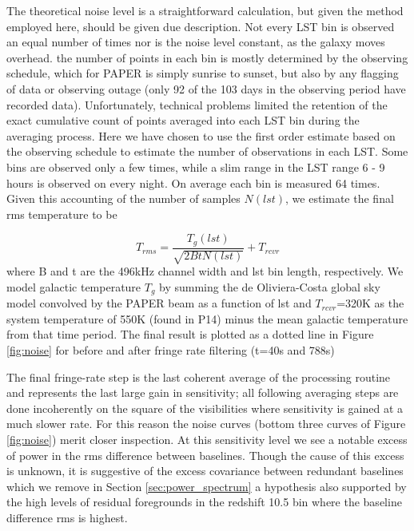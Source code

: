 \documentclass[preprint]{aastex}
\begin{document}
The theoretical noise level is a straightforward calculation, but given the method employed here, should be given due description.
Not every LST bin is observed an equal number of times nor is the noise level constant, as the galaxy moves overhead.  the number of points in each bin is mostly determined by the observing schedule, which for PAPER is simply sunrise to sunset, but also by any flagging of data or observing outage (only 92 of the 103 days in the observing period have recorded data).  Unfortunately, technical problems limited the retention of the exact cumulative count of points averaged into each LST bin during the averaging process.  Here we have chosen to use the first order estimate based on the observing schedule to estimate the number of observations in each LST. Some bins are observed only a few times, while a slim range in the LST range 6 - 9 hours is observed on every night. On average each bin is measured 64 times. Given this accounting of the number of samples $N(lst)$, we estimate the final rms temperature to be

\[
T_{rms}  = \frac{T_{g}(lst)}{\sqrt{2BtN(lst)}} + T_{rcvr}
\]
where B and t are the 496kHz channel width and lst bin length, respectively. We model galactic temperature $T_g$ by summing the de Oliviera-Costa global sky model \citep{deOliveiraCosta:2008p2242} convolved by the PAPER beam as a function of lst and $T_{rcvr}$=320K as the system temperature of 550K (found in P14) minus the mean galactic temperature from that time period. The final result is plotted as a dotted line in Figure \ref{fig:noise} for before and after fringe rate filtering (t=40s and 788s)%


The final fringe-rate step is the last coherent average of the processing routine and represents the last large gain in sensitivity; all following averaging steps are done incoherently on the square of the visibilities where sensitivity is gained at a much slower rate. For this reason the noise curves (bottom three curves of Figure \ref{fig:noise})  merit closer inspection.  At this sensitivity level we see a notable excess of power in the rms difference between baselines. Though the cause of this excess is unknown, it is suggestive of the excess covariance between redundant baselines which we remove in Section \ref{sec:power_spectrum} a hypothesis also supported by the high levels of residual foregrounds in the redshift 10.5 bin where the baseline difference rms is highest.
\end{document}
